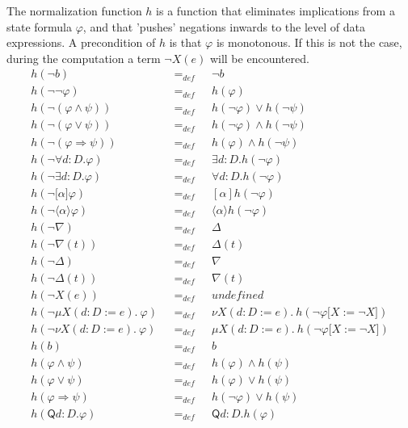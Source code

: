 \documentclass{article}
\begin{document}
The normalization function $h$ is a function that eliminates implications
from a state formula $\varphi $, and that 'pushes' negations inwards to the
level of data expressions. A precondition of $h$ is that $\varphi $ is
monotonous. If this is not the case, during the computation a term $\lnot
X(e)$ will be encountered.%
\begin{equation*}
\begin{array}{lll}
h(\lnot b) & =_{def} & \lnot b \\ 
h(\lnot \lnot \varphi ) & =_{def} & h(\varphi ) \\ 
h(\lnot (\varphi \wedge \psi )) & =_{def} & h(\lnot \varphi )\vee h(\lnot
\psi ) \\ 
h(\lnot (\varphi \vee \psi )) & =_{def} & h(\lnot \varphi )\wedge h(\lnot
\psi ) \\ 
h(\lnot (\varphi \Rightarrow \psi )) & =_{def} & h(\varphi )\wedge h(\lnot
\psi ) \\ 
h(\lnot \forall d{{:}D}.\varphi ) & =_{def} & \exists d{{:}D}.h(\lnot
\varphi ) \\ 
h(\lnot \exists d{{:}D}.\varphi ) & =_{def} & \forall d{{:}D}.h(\lnot
\varphi ) \\ 
h(\lnot \lbrack \alpha ]\varphi ) & =_{def} & [\alpha ]h(\lnot \varphi ) \\ 
h(\lnot \langle \alpha \rangle \varphi ) & =_{def} & \langle \alpha \rangle
h(\lnot \varphi ) \\ 
h(\lnot \nabla ) & =_{def} & \Delta \\ 
h(\lnot \nabla (t)) & =_{def} & \Delta (t) \\ 
h(\lnot \Delta ) & =_{def} & \nabla \\ 
h(\lnot \Delta (t)) & =_{def} & \nabla (t) \\ 
h(\lnot X(e)) & =_{def} & undefined \\ 
h(\lnot \mu X(d{:}D:=e).~\varphi )~~~ & =_{def}~~~ & \nu X(d{:}%
D:=e).~h(\lnot \varphi \lbrack X:=\lnot X]) \\ 
h(\lnot \nu X(d{:}D:=e).~\varphi )~~~ & =_{def}~~~ & \mu X(d{:}%
D:=e).~h(\lnot \varphi \lbrack X:=\lnot X]) \\ 
h(b) & =_{def} & b \\ 
h(\varphi \wedge \psi ) & =_{def} & h(\varphi )\wedge h(\psi ) \\ 
h(\varphi \vee \psi ) & =_{def} & h(\varphi )\vee h(\psi ) \\ 
h(\varphi \Rightarrow \psi ) & =_{def} & h(\lnot \varphi )\vee h(\psi ) \\ 
h(\mathsf{Q}d{{:}D}.\varphi ) & =_{def} & \mathsf{Q}d{{:}D}.h(\varphi ) \\ 

\end{array}
\end{equation*}
\end{document}
